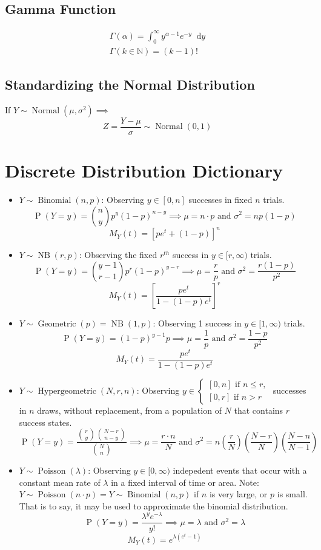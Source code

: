 \documentclass[12pt]{article}
\newcommand{\If}[1]{\textrm{ if #1}}
\newcommand{\ns}[1]{\mathbb{#1}}
\newcommand{\defn}[1]{\textbf{#1}:}
\newcommand{\pr}[1]{\operatorname{P}(#1)}
\newcommand{\binomdist}[3]{#1 \sim \operatorname{Binomial}(#2, #3)}
\newcommand{\geodist}[2]{#1 \sim \operatorname{Geometric}(#2)}
\newcommand{\nbinomdist}[3]{#1 \sim \operatorname{NB}(#2, #3)}
\newcommand{\hypegeodist}[4]{#1 \sim \operatorname{Hypergeometric}(#2, #3, #4)}
\newcommand{\normdist}[3]{#1 \sim \operatorname{Normal}(#2, #3)}
\newcommand{\poisson}[2]{#1 \sim \operatorname{Poisson}(#2)}
\newcommand*\diff{\mathop{}\!\mathrm{d}}
\newcommand{\intv}[4]{\int_{#3}^{#4} #1 \diff #2}
\renewcommand{\and}{\text{ and }}
\begin{document}
\subsection{Gamma Function}
\begin{align*}
    \Gamma(\alpha) = \intv{ y^{\alpha - 1}e^{-y} }{y}{0}{\infty}\\
    \Gamma(k\in\ns{N}) = (k-1)!
\end{align*}
\subsection{Standardizing the Normal Distribution}
If $\normdist{Y}{\mu}{\sigma^2} \implies $ \[
    \normdist{Z = \frac{Y - \mu}{\sigma}}{0}{1}
\]
\clearpage
\newpage
\section{Discrete Distribution Dictionary}
\begin{itemize}
    \item \defn{$\binomdist{Y}{n}{p}$}
    Observing $y \in [0,n]$ successes in fixed $n$ trials.
    \[
        \pr{Y=y} = \binom{n}{y}p^y(1-p)^{n-y} \implies \mu = n\cdot p \and \sigma^2 = np(1-p)
    \]
    \[
        M_Y(t) = \left[pe^t+(1-p)\right]^n
    \]
    \item \defn{$\nbinomdist{Y}{r}{p}$}
    Observing the fixed $r^{th}$ success in $y \in [r, \infty)$ trials.
    \[
        \pr{Y=y} = \binom{y-1}{r-1}p^{r}(1-p)^{y-r} \implies \mu = \frac{r}{p} \and \sigma^2 = \frac{r(1-p)}{p^2}
    \]
    \[
        M_Y(t) = {\left[\frac{pe^t}{1-(1-p)e^t}\right]}^r
    \]
    \item \defn{$\geodist{Y}{p} = \operatorname{NB}(1,p)$}
    Observing 1 success in $y \in [1, \infty)$ trials.
    \[
        \pr{Y=y} = (1-p)^{y-1}p \implies \mu = \frac{1}{p} \and \sigma^2 = \frac{1-p}{p^2}
    \]
    \[
        M_Y(t) = \frac{pe^t}{1-(1-p)e^t}
    \]
    \item \defn{$\hypegeodist{Y}{N}{r}{n}$}
    Observing $y \in \begin{cases}
        [0, n] \If{} n \leq r,\\
        [0, r] \If{} n > r
    \end{cases}$ successes in $n$ draws, without replacement,
    from a population of $N$ that contains $r$ success states.
    \[
        \pr{Y=y} = \frac{\binom{r}{y}\binom{N-r}{n-y}}{\binom{N}{n}}
        \implies \mu = \frac{r\cdot n}{N} \and \sigma^2 = 
        n\left(\frac{r}{N}\right)\left(\frac{N-r}{N}\right)\left(\frac{N-n}{N-1}\right)
    \]

    \item \defn{$\poisson{Y}{\lambda}$}
    Observing $y\in [0,\infty)$ indepedent events that occur with a
    constant mean rate of $\lambda$ in a fixed interval of time or area.
    Note: $\poisson{Y}{n\cdot p} = \binomdist{Y}{n}{p}$ if $n$ is very large, or $p$ is small.
    That is to say, it may be used to approximate the binomial distribution.
    \[
        \pr{Y=y} = \frac{\lambda^{y}e^{-\lambda}}{y!} \implies \mu = \lambda \and \sigma^2 = \lambda
    \]
    \[
        M_Y(t) = e^{\lambda(e^t-1)}
    \]
\end{itemize}
\clearpage
\end{document}
